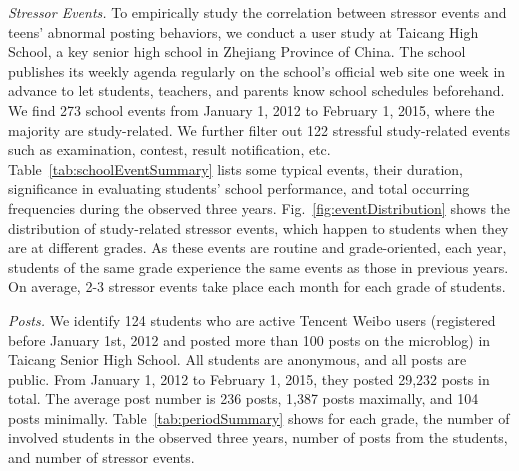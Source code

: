 \emph{Stressor Events.} To empirically study the correlation between stressor events and teens' abnormal posting behaviors,
we conduct a user study at Taicang High School, a key senior high school in Zhejiang Province of China.
The school publishes its weekly agenda regularly on the school's official web site one week in advance
to let students, teachers, and parents know school schedules beforehand.
We find 273 school events from January 1, 2012 to February 1, 2015,
where the majority are study-related. We further filter out 122 stressful study-related events such as
examination, contest, result notification, etc.
Table~\ref{tab:schoolEventSummary} lists some typical events, their duration, significance in evaluating students' school performance,
and total occurring frequencies during the observed three years.
Fig.~\ref{fig:eventDistribution} shows the distribution of
study-related stressor events, which happen to students when they are at different grades.
As these events are routine and grade-oriented, each year, students of the same grade experience the same events as those in previous years.
On average, 2-3 stressor events take place each month for each grade of students.

\emph{Posts.}
We identify 124 students who are active Tencent Weibo users
(registered before January 1st, 2012 and posted more than 100 posts on the microblog)
in Taicang Senior High School.
All students are anonymous, and all posts are public.
From January 1, 2012 to February 1, 2015, they posted 29,232 posts in total.
The average post number is 236 posts, 1,387 posts maximally, and 104 posts minimally.
Table~\ref{tab:periodSummary} shows for each grade, the number of involved students in the observed
three years, number of posts from the students, and number of stressor events.

